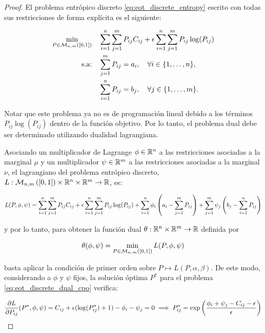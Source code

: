 \begin{proof}
	El problema entrópico discreto \eqref{eq:eot_discrete_entropy} escrito con todas sus restricciones de forma explícita es el siguiente:

	\begin{align*}
		\min_{P\in\mathcal{M}_{n,m}\left([0,1]\right)} \quad & \sum_{i=1}^n\sum_{j=1}^m P_{ij}C_{ij} + \epsilon\sum_{i=1}^n\sum_{j=1}^m P_{ij}\log(P_{ij}) \\
		\text{s.a:} \quad                         & \sum_{j=1}^m P_{ij} = a_i,\quad \forall i\in\{1,\ldots,n\},                                 \\
		                                          & \sum_{i=1}^n P_{ij} = b_j,\quad \forall j\in\{1,\ldots,m\}.
	\end{align*}

	Notar que este problema ya no es de programación lineal debido a los términos $P_{ij}\log(P_{ij})$ dentro de la función objetivo. Por lo tanto, el problema dual debe ser determinado utilizando dualidad lagrangiana.


	Asociando un multiplicador de Lagrange $\phi\in\mathbb{R}^n$ a las restricciones asociadas a la marginal $\mu$ y un multiplicador $\psi\in\mathbb{R}^m$ a las restricciones asociadas a la marginal $\nu$, el lagrangiano del problema entrópico discreto, $L:\mathcal{M}_{n,m}\left([0,1]\right)\times\mathbb{R}^n\times\mathbb{R}^m\to\mathbb{R}$, es:

	\begin{equation*}
		L(P,\phi,\psi) = \sum_{i=1}^n\sum_{j=1}^m P_{ij}C_{ij} + \epsilon\sum_{i=1}^n\sum_{j=1}^m P_{ij}\log(P_{ij}) + \sum_{i=1}^n \phi_i \left(a_i - \sum_{j=1}^m P_{ij}\right) + \sum_{j=1}^m \psi_j \left(b_j - \sum_{i=1}^n P_{ij}\right)
	\end{equation*}

	y por lo tanto, para obtener la función dual $\theta:\mathbb{R}^n\times\mathbb{R}^m\to\mathbb{R}$ definida por

	\begin{equation}
		\label{eq:eot_discrete_dual_cpo}
		\theta(\phi,\psi)= \min_{P\in\mathcal{M}_{n,m}\left([0,1]\right)} L(P,\phi,\psi)
	\end{equation}

	basta aplicar la condición de primer orden sobre $P\mapsto L(P,\alpha,\beta)$. De este modo, considerando a $\phi$ y $\psi$ fijos, la solución óptima $P^*$ para el problema \eqref{eq:eot_discrete_dual_cpo} verifica:

	\begin{align*}
		\frac{\partial L}{\partial P_{ij}}(P^*,\phi,\psi) = C_{ij} + \epsilon(\log(P_{ij}^*)+1) - \phi_i - \psi_j = 0 \implies P_{ij}^* = \exp\left(\frac{\phi_i + \psi_j-C_{ij} - \epsilon}{\epsilon}\right)
	\end{align*}


\end{proof}
